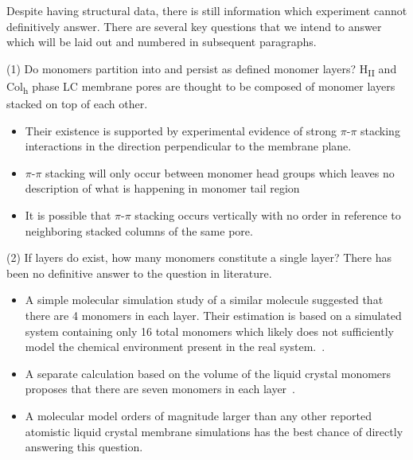 \documentclass{article}
\begin{document}
  Despite having structural data, there is still information which 
  experiment cannot definitively answer. There are several key 
  questions that we intend to answer which will be laid out and numbered
  in subsequent paragraphs. 

  (1) Do monomers partition into and persist as defined monomer layers?
  H\textsubscript{II} and Col\textsubscript{h} phase LC membrane pores are 
  thought to be composed of monomer layers stacked on top of each other. 
  \begin{itemize}
  	\item Their existence is supported by experimental evidence of strong 
	$\pi$-$\pi$ stacking interactions in the direction perpendicular to the
	membrane plane.
	\item $\pi$-$\pi$ stacking will only occur between monomer head groups which
	leaves no description of what is happening in monomer tail region
	\item It is possible that $\pi$-$\pi$ stacking occurs vertically 
	with no order in reference to neighboring stacked columns of the same pore.  %
  \end{itemize}

  (2) If layers do exist, how many monomers constitute a single layer?
  There has been no definitive answer to the question in literature.
  \begin{itemize}
    \item A simple molecular simulation study of a similar molecule suggested
    that there are 4 monomers in each layer. Their estimation is based on a
    simulated system containing only 16 total monomers which likely does not sufficiently
    model the chemical environment present in the real system.~\cite{zhu_methacrylated_2006}. 
    \item A separate calculation based on the volume of the liquid crystal monomers proposes
    that there are seven monomers in each layer~\cite{resel_structural_2000}. 
    \item A molecular model orders of magnitude larger than any other reported atomistic 
    liquid crystal membrane simulations has the best chance of directly answering this question.
  \end{itemize}
    
\end{document}
